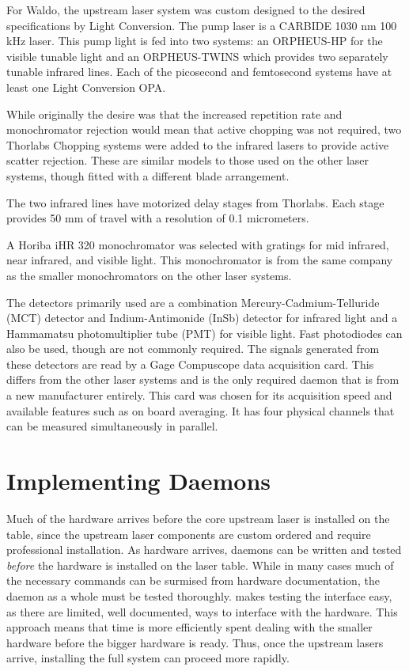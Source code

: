 For Waldo, the upstream laser system was custom designed to the desired specifications by Light Conversion.
The pump laser is a CARBIDE 1030 nm 100 kHz laser\cite{lightcon_carbide}.
This pump light is fed into two systems: an ORPHEUS-HP for the visible tunable light and an ORPHEUS-TWINS which provides two separately tunable infrared lines.
Each of the picosecond and femtosecond systems have at least one Light Conversion OPA.

While originally the desire was that the increased repetition rate and monochromator rejection would mean that active chopping was not required, two Thorlabs Chopping systems\cite{thorlabs_mc2000b} were added to the infrared lasers to provide active scatter rejection.
These are similar models to those used on the other laser systems, though fitted with a different blade arrangement.

The two infrared lines have motorized delay stages from Thorlabs\cite{thorlabs_lnr502e}.
Each stage provides 50 mm of travel with a resolution of 0.1 micrometers.

A Horiba iHR 320 monochromator\cite{horiba_ihr} was selected with gratings for mid infrared, near infrared, and visible light.
This monochromator is from the same company as the smaller monochromators on the other laser systems.

The detectors primarily used are a combination Mercury-Cadmium-Telluride (MCT) detector and Indium-Antimonide (InSb) detector for infrared light and a Hammamatsu photomultiplier tube (PMT) for visible light.
Fast photodiodes can also be used, though are not commonly required.
The signals generated from these detectors are read by a Gage Compuscope data acquisition card\cite{gage_octave}.
This differs from the other laser systems and is the only required daemon that is from a new manufacturer entirely.
This card was chosen for its acquisition speed and available features such as on board averaging.
It has four physical channels that can be measured simultaneously in parallel.


\clearpage

\section{Implementing Daemons}  %

Much of the hardware arrives before the core upstream laser is installed on the table, since the upstream laser components are custom ordered and require professional installation.
As hardware arrives, \yaq{} daemons can be written and tested \textit{before} the hardware is installed on the laser table.
While in many cases much of the necessary commands can be surmised from hardware documentation, the daemon as a whole must be tested thoroughly.
\yaq{} makes testing the interface easy, as there are limited, well documented, ways to interface with the hardware.
This approach means that time is more efficiently spent dealing with the smaller hardware before the bigger hardware is ready.
Thus, once the upstream lasers arrive, installing the full system can proceed more rapidly.

